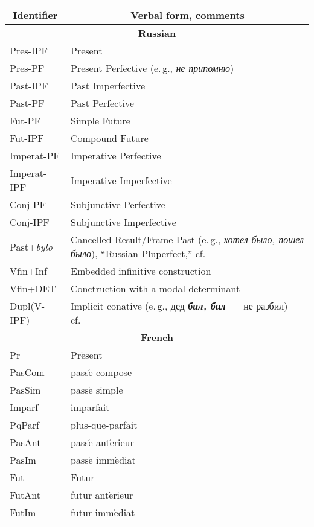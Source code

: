 \begin{table}\small
\begin{center}
\vspace*{2ex}

\begin{tabular}{ll}
\hline
\multicolumn{1}{c}{Identifier}&\multicolumn{1}{c}{Verbal form, comments}\\
\hline 
\multicolumn{2}{c}{\textbf{Russian}}\\
\hline
Pres-IPF&Present\\
Pres-PF&Present Perfective (e.\,g., \textit{не припомню})\\
Past-IPF&Past Imperfective\\
Past-PF&Past Perfective\\
Fut-PF&Simple Future\\
Fut-IPF&Compound Future\\
Imperat-PF&Imperative Perfective\\
Imperat-IPF&Imperative Imperfective \\
Conj-PF&Subjunctive Perfective\\
Conj-IPF&Subjunctive Imperfective\\
Past\;+\;\textit{bylo}&Cancelled Result/Frame Past (e.\,g., \textit{хотел было, пошел было}), 
``Russian Pluperfect,'' cf. \cite{31-zat}\\
Vfin\;+\;Inf&Embedded infinitive construction\\
Vfin\;+\;DET&Conctruction with a modal determinant \\
Dupl(V-IPF)&Implicit conative (e.\,g., дед {\bfseries\textit{бил, бил}}~--- не разбил)
 cf.~\cite{32-zat}\\
\hline
\multicolumn{2}{c}{\textbf{French}}\\
\hline
Pr&Pr$\acute{\mbox{e}}$sent\\
PasCom&pass$\acute{\mbox{e}}$ compose\\
PasSim&pass$\acute{\mbox{e}}$ simple\\ 
Imparf&imparfait \\
PqParf&plus-que-parfait\\
PasAnt&pass$\acute{\mbox{e}}$ ant$\acute{\mbox{e}}$rieur\\
PasIm&pass$\acute{\mbox{e}}$ imm$\acute{\mbox{e}}$diat\\
Fut&Futur\\
FutAnt&futur ant$\acute{\mbox{e}}$rieur\\
FutIm&futur imm$\acute{\mbox{e}}$diat\\

\end{tabular}
\end{center}
\end{table}
